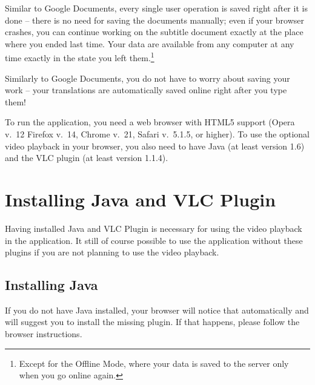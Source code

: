 Similar to Google Documents, every single user operation is saved right after it is done -- there is no need for saving the documents manually; even if your browser crashes, you can continue working on the subtitle document exactly at the place where you ended last time.
Your data are available from any computer at any time exactly in the state you left them.\footnote{Except for the Offline Mode, where your data is saved to the server only when you go online again.}

Similarly to Google Documents, you do not have to worry about saving your work -- your translations are automatically saved online right after you type them!

To run the application, you need a web browser with HTML5 support (Opera v.~12
Firefox v.~14, Chrome v.~21, Safari v.~5.1.5, or higher). To use the optional video playback in your browser, you also need to have Java (at least version 1.6) and the VLC plugin (at least version 1.1.4).

\section{Installing Java and VLC Plugin}
\label{um:sec:installations}

Having installed Java and VLC Plugin is necessary for using the video playback in the application. It still of course possible to use the application without these plugins if you are not planning to use the video playback.

\subsection{Installing Java}

If you do not have Java installed, your browser will notice that automatically and will suggest you to install the missing plugin. If that happens, please follow the browser instructions.

